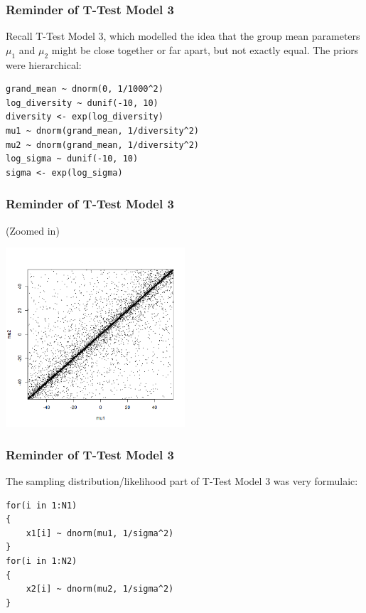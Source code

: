 \documentclass{beamer}
\begin{document}
\begin{frame}[fragile]
\frametitle{Reminder of T-Test Model 3}
Recall T-Test Model 3, which modelled the idea that the group mean
parameters $\mu_1$ and $\mu_2$ might be close together or far apart, but not
exactly equal. The priors were hierarchical:\pause
\footnotesize

\begin{verbatim}
grand_mean ~ dnorm(0, 1/1000^2)
log_diversity ~ dunif(-10, 10)
diversity <- exp(log_diversity)
mu1 ~ dnorm(grand_mean, 1/diversity^2)
mu2 ~ dnorm(grand_mean, 1/diversity^2)
log_sigma ~ dunif(-10, 10)
sigma <- exp(log_sigma)
\end{verbatim}

\end{frame}


\begin{frame}[fragile]
\frametitle{Reminder of T-Test Model 3}
(Zoomed in)
\begin{center}
\includegraphics[width=0.5\textwidth]{images/ttest_prior3.png}
\end{center}

\end{frame}



\begin{frame}[fragile]
\frametitle{Reminder of T-Test Model 3}
The sampling distribution/likelihood part of T-Test Model 3 was very
formulaic:

\begin{verbatim}
for(i in 1:N1)
{
    x1[i] ~ dnorm(mu1, 1/sigma^2)
}
for(i in 1:N2)
{
    x2[i] ~ dnorm(mu2, 1/sigma^2)
}
\end{verbatim}

\end{frame}
\end{document}
